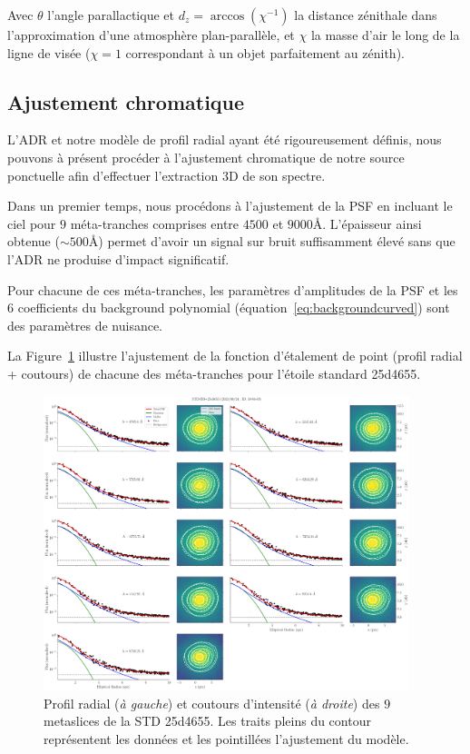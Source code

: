 \documentclass[../main/main.tex]{subfiles}
\begin{document}
Avec $\theta$ l'angle parallactique et $d_{z} = \arccos{\left(\chi^{-1}\right)}$ la
distance zénithale dans l'approximation d'une atmosphère plan-parallèle,
et $\chi$ la masse d'air le long de la ligne de visée ($\chi=1$
correspondant à un objet parfaitement au zénith).


\subsection{Ajustement chromatique}\label{ssec:chrom}

L'ADR et notre modèle de profil radial ayant été rigoureusement définis,
nous pouvons à présent procéder à l'ajustement chromatique de notre
source ponctuelle afin d'effectuer l'extraction 3D de son spectre.

Dans un premier temps, nous procédons à l'ajustement de la PSF en
incluant le ciel pour $9$ méta-tranches comprises entre $4500$ et
$9000$\AA. L'épaisseur ainsi obtenue ($\sim500$\AA) permet d'avoir un
signal sur bruit suffisamment élevé sans que l'ADR ne produise d'impact
significatif.

Pour chacune de ces méta-tranches, les paramètres d'amplitudes de la PSF
et les $6$ coefficients du background polynomial (équation~\ref{eq:backgroundcurved}) sont des paramètres de nuisance.

La Figure~\ref{fig:allmetastd} illustre l'ajustement de la fonction
d'étalement de point (profil radial + coutours) de chacune des méta-tranches pour l'étoile
standard 25d4655.

\begin{figure}[ht]
  \centering
  \includegraphics[width=0.95\textwidth]{../figures/06_irf/STD_profile_allmeta.pdf}
  \caption[Profil radial et coutours des $9$ metaslices de la STD
  25d4655]{Profil radial (\textit{à gauche}) et coutours d'intensité
    (\textit{à droite}) des $9$ metaslices de la STD
    25d4655. Les traits pleins du contour représentent les données et
    les pointillées l'ajustement du modèle.}
  \label{fig:allmetastd}
\end{figure}
\end{document}

